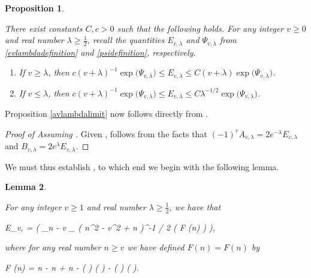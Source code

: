 \documentclass[10pt,a4paper]{article}
\theoremstyle{plain}\newtheorem{theorem}{Theorem}
\newtheorem{lemma}[theorem]{Lemma}
\newtheorem{proposition}[theorem]{Proposition}
\theoremstyle{definition}
\begin{document}
    \begin{proposition}
    
    \label{estimateevlambda} 
    
    There exist constants $C, c > 0$ such that the following holds. For any integer $v \ge 0$ and real number $\lambda \ge \frac{1}{2}$, recall the quantities $E_{v, \lambda}$ and $\Psi_{v, \lambda}$ from \eqref{evlambdadefinition} and \eqref{psidefinition}, respectively. 
    
    \begin{enumerate}
    	\item If $v \ge \lambda$, then $c (v + \lambda)^{-1} \exp \big( \Psi_{v, \lambda} \big) \le E_{v, \lambda} \le C (v + \lambda) \exp \big( \Psi_{v, \lambda} \big)$.
		
	\item If $v \le \lambda$, then $c (v + \lambda)^{-1} \exp \big( \Psi_{v, \lambda} \big) \le E_{v, \lambda} \le C \lambda^{-1/2} \exp \big( \Psi_{v, \lambda} \big)$.
		
	\end{enumerate} 
	\end{proposition}
	
	Proposition \ref{avlambdalimit} now follows directly from . 

	\begin{proof}[Proof of  Assuming ]

    Given ,  follows from the facts that $(-1)^v A_{v, \lambda} = 2 e^{-\lambda} E_{v, \lambda}$ and $B_{v, \lambda} = 2 e^{\lambda} E_{v, \lambda}$.
    \end{proof}
	
	We must thus establish , to which end we begin with the following lemma. 
	
	\begin{lemma} 
	
	\label{estimateevlambda1} 
	
	For any integer $v \ge 1$ and real number $\lambda \ge \frac{1}{2}$, we have that
	\begin{flalign}
	\label{evlambdafestimate} 
	E_{v, \lambda} = \Theta \Bigg( \displaystyle\sum_{n - v  _{}} \big( n^2 - v^2 + n \big)^{-1 / 2} \exp \big( F (n) \big) \Bigg),
	\end{flalign}
	
	\noindent where for any real number $n \ge v$ we have defined $F (n) = F (n)$ by 
	\begin{flalign}
	\label{f}
	F (n) = n \log \lambda - n  + n - \Big(  \Big) \log \Big(  \Big) - \Big(  \Big) \log \Big(  \Big).
	\end{flalign}
	
	\end{lemma} 
	
\end{document}
